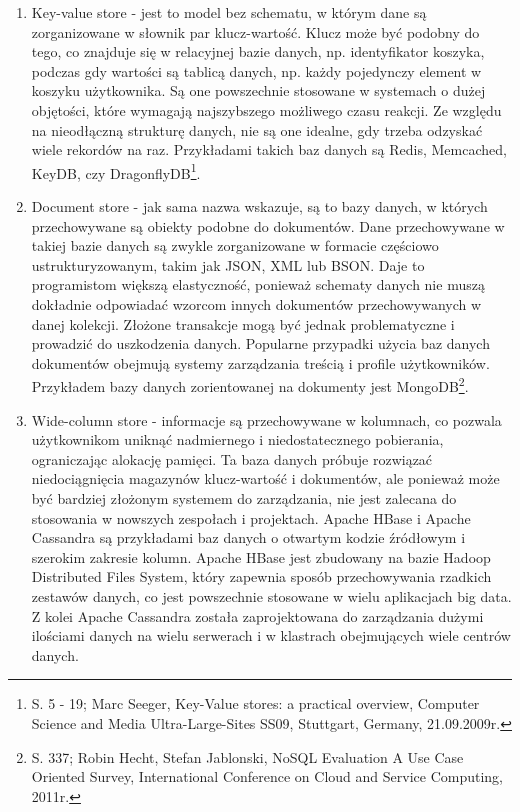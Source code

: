 \documentclass[12pt, a4paper, twoside, openany]{book}
\begin{document}
\begin{enumerate}[label=--]
    \item Key-value store - jest to model bez schematu, w którym dane są zorganizowane w słownik par klucz-wartość.
    Klucz może być podobny do tego, co znajduje się w relacyjnej bazie danych, np. identyfikator koszyka, podczas gdy wartości są tablicą danych, np. każdy pojedynczy element w koszyku użytkownika.
    Są one powszechnie stosowane w systemach o dużej objętości, które wymagają najszybszego możliwego czasu reakcji.
    Ze względu na nieodłączną strukturę danych, nie są one idealne, gdy trzeba odzyskać wiele rekordów na raz.
    Przykładami takich baz danych są Redis, Memcached, KeyDB, czy DragonflyDB\footnote{S. 5 - 19; Marc Seeger, Key-Value stores: a practical overview, Computer Science and Media Ultra-Large-Sites SS09, Stuttgart, Germany, 21.09.2009r.}.
    \item Document store - jak sama nazwa wskazuje, są to bazy danych, w których przechowywane są obiekty podobne do dokumentów.
    Dane przechowywane w takiej bazie danych są zwykle zorganizowane w formacie częściowo ustrukturyzowanym, takim jak JSON, XML lub BSON.
    Daje to programistom większą elastyczność, ponieważ schematy danych nie muszą dokładnie odpowiadać wzorcom innych dokumentów przechowywanych w danej kolekcji.
    Złożone transakcje mogą być jednak problematyczne i prowadzić do uszkodzenia danych.
    Popularne przypadki użycia baz danych dokumentów obejmują systemy zarządzania treścią i profile użytkowników.
    Przykładem bazy danych zorientowanej na dokumenty jest MongoDB\footnote{S. 337; Robin Hecht, Stefan Jablonski, NoSQL Evaluation A Use Case Oriented Survey, International Conference on Cloud and Service Computing, 2011r.}.
    \item Wide-column store - informacje są przechowywane w kolumnach, co pozwala użytkownikom uniknąć nadmiernego i niedostatecznego pobierania, ograniczając alokację pamięci.
    Ta baza danych próbuje rozwiązać niedociągnięcia magazynów klucz-wartość i dokumentów, ale ponieważ może być bardziej złożonym systemem do zarządzania, nie jest zalecana do stosowania w nowszych zespołach i projektach.
    Apache HBase i Apache Cassandra są przykładami baz danych o otwartym kodzie źródłowym i szerokim zakresie kolumn.
    Apache HBase jest zbudowany na bazie Hadoop Distributed Files System, który zapewnia sposób przechowywania rzadkich zestawów danych, co jest powszechnie stosowane w wielu aplikacjach big data.
    Z kolei Apache Cassandra została zaprojektowana do zarządzania dużymi ilościami danych na wielu serwerach i w klastrach obejmujących wiele centrów danych.

\end{enumerate}
\end{document}
